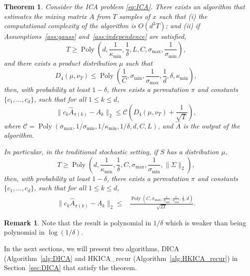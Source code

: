 \documentclass{article}
\DeclareMathOperator{\pol}{Poly}
\newcommand{\poly}[1]{\pol\left(#1\right)}
\newtheorem{thm}[lemma]{Theorem}
\theoremstyle{definition}
\newtheorem{remark}[lemma]{Remark}
\begin{document}
\begin{thm}
\label{thm:finalRes} Consider the ICA problem \eqref{eq:ICA}. There exists an algorithm that estimates the mixing matrix $A$ from $T$ samples of $x$ such that (i) the computational complexity of the algorithm is $O(d^3 T)$; and (ii) if Assumptions~\ref{ass:gauss} and~\ref{ass:independence} are satisfied,
\[
T \ge \poly{d, \frac{1}{\kappa_{\min}}, \frac{1}{\delta}, L, C, \sigma_{\max}, \frac{1}{\sigma_{\min}}},
\]
and there exists a product distribution  $\mu$  such that 
\[
D_4(\mu, \nu_T) \le \poly{\frac{1}{C},  \sigma_{\min},  \frac{1}{\sigma_{\max}},\frac{1}{d}, \delta, \kappa_{\min}},
\]
then, with probability at least $1-\delta$, there exists a permutation $\pi$ and constants $\{c_1,\ldots,c_d\}$, such that for all $1\le k\le d$,
\[
\| c_k\hat{A}_{\pi(k)} - A_k\|_2 \le \mathcal{C}\left(D_4(\mu, \nu_T)+\frac{1}{\sqrt{T}}\right),
\]
where $\mathcal{C} = \poly{\sigma_{\max}, 1/\sigma_{\min}, 1/\kappa_{\min},1/\delta, d, C, L}$, and $\hat{A}$ is the output of the algorithm.

In particular, in the traditional stochastic setting, if $S$ has a distribution $\mu$, 
\[
T \ge \poly{d, \frac{1}{\kappa_{\min}}, \frac{1}{\delta}, C, \sigma_{\max}, \frac{1}{\sigma_{\min}}, \|\Sigma\|_2},
\]
then, with probability at least $1-\delta$, there exists a permutation $\pi$ and constants $\{c_1,\ldots,c_d\}$, such that for all $1\le k\le d$,
\begin{align*}
 \| c_k\hat{A}_{\pi(k)} - A_k\|_2 \le 
& \frac{\poly{C, \sigma_{\max}, \frac{1}{\sigma_{\min}}, \frac{1}{\kappa_{\min}},\frac{1}{\delta}, d}}{\sqrt{2T}}.
\end{align*}
\end{thm}
\begin{remark} %
Note that the result is polynomial in $1/\delta$ which is weaker than being polynomial in $\log(1/\delta)$.
\end{remark}

In the next sections, we will present two algorithms, DICA (Algorithm~\ref{alg:DICA} and HKICA\_recur (Algorithm~\ref{alg:HKICA_recur}) in Section~\ref{sec:DICA} that 
satisfy the theorem.
\end{document}
